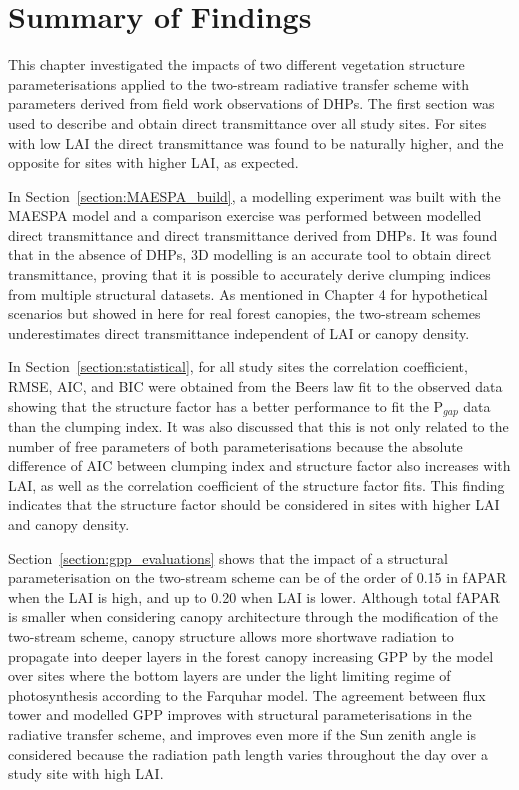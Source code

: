 \documentclass[a4paper,11pt]{report}
\begin{document}
\section{Summary of Findings}

This chapter investigated the impacts of two different vegetation structure parameterisations applied to the two-stream radiative transfer scheme with parameters derived from field work observations of DHPs. The first section was used to describe and obtain direct transmittance over all study sites. For sites with low LAI the direct transmittance was found to be naturally higher, and the opposite for sites with higher LAI, as expected. 

In Section~\ref{section:MAESPA_build}, a modelling experiment was built with the MAESPA model and a comparison exercise was performed between modelled direct transmittance and direct transmittance derived from DHPs. It was found that in the absence of DHPs, 3D modelling is an accurate tool to obtain direct transmittance, proving that it is possible to accurately derive clumping indices from multiple structural datasets. As mentioned in Chapter 4 for hypothetical scenarios but showed in here for real forest canopies, the two-stream schemes underestimates direct transmittance independent of LAI or canopy density.

In Section~\ref{section:statistical}, for all study sites the correlation coefficient, RMSE, AIC, and BIC were obtained from the Beer\textquotesingle s law fit to the observed data showing that the structure factor has a better performance to fit the P$_{gap}$ data than the clumping index. It was also discussed that this is not only related to the number of free parameters of both parameterisations because the absolute difference of AIC between clumping index and structure factor also increases with LAI, as well as the correlation coefficient of the structure factor fits. This finding indicates that the structure factor should be considered in sites with higher LAI and canopy density.

Section~\ref{section:gpp_evaluations} shows that the impact of a structural parameterisation on the two-stream scheme can be of the order of 0.15 in fAPAR when the LAI is high, and up to 0.20 when LAI is lower. Although total fAPAR is smaller when considering canopy architecture through the modification of the two-stream scheme, canopy structure allows more shortwave radiation to propagate into deeper layers in the forest canopy increasing GPP by the model over sites where the bottom layers are under the light limiting regime of photosynthesis according to the Farquhar model. The agreement between flux tower and modelled GPP improves with structural parameterisations in the radiative transfer scheme, and improves even more if the Sun zenith angle is considered because the radiation path length varies throughout the day over a study site with high LAI. 
\end{document}
